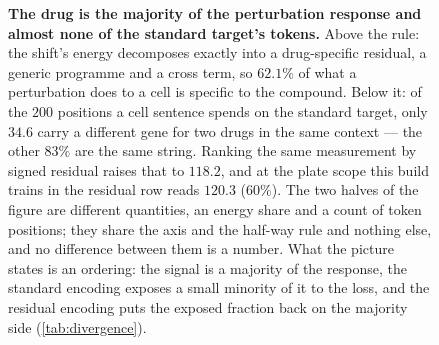 \begin{figure}[htbp]
\caption[The drug is most of the response, little of the
target]{\textbf{The drug is the majority of the perturbation response and almost
none of the standard target's tokens.} Above the rule: the shift's energy
decomposes exactly into a drug-specific residual, a generic programme and a
cross term, so $62.1\%$ of what a perturbation does to a cell is specific to
the compound. Below it: of the $200$ positions a cell sentence spends on the
standard target, only $34.6$ carry a different gene for two drugs in the same
context --- the other $83\%$ are the same string. Ranking the same measurement
by signed residual raises that to $118.2$, and at the plate scope this build
trains in the residual row reads $120.3$ ($60\%$). The two halves of the figure
are different quantities, an energy share and a count of token positions; they
share the axis and the half-way rule and nothing else, and no difference
between them is a number. What the picture states is an ordering: the signal is
a majority of the response, the standard encoding exposes a small minority of
it to the loss, and the residual encoding puts the exposed fraction back on the
majority side (\cref{tab:divergence}).}
\label{fig:residual-energy}
\end{figure}
